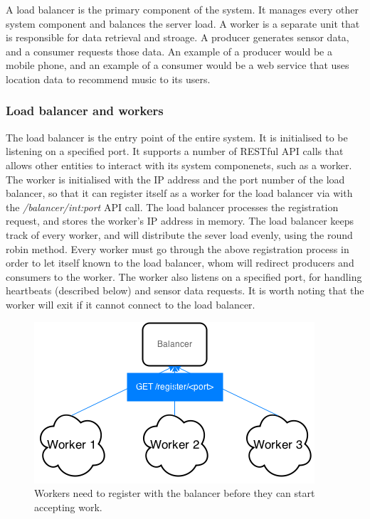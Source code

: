 \documentclass{sigchi}
\begin{document}
A load balancer is the primary component of the system. It manages every other system component and balances the server load. A worker is a separate unit that is responsible for data retrieval and stroage. A producer generates sensor data, and a consumer requests those data. An example of a producer would be a mobile phone, and an example of a consumer would be a web service that uses location data to recommend music to its users.

\subsubsection{Load balancer and workers}

The load balancer is the entry point of the entire system. It is initialised to be listening on a specified port. It supports a number of RESTful API calls that allows other entities to interact with its system componenets, such as a worker. The worker is initialised with the IP address and the port number of the load balancer, so that it can register itself as a worker for the load balancer via with the {\it /balancer/int:port} API call. The load balancer processes the registration request, and stores the worker's IP address in memory. The load balancer keeps track of every worker, and will distribute the sever load evenly, using the round robin method. Every worker must go through the above registration process in order to let itself known to the load balancer, whom will redirect producers and consumers to the worker. The worker also listens on a specified port, for handling heartbeats (described below) and sensor data requests. It is worth noting that the worker will exit if it cannot connect to the load balancer.

\begin{figure}[!h]
\centering
\includegraphics[width=0.9\columnwidth]{img/workerreg}
\caption{Workers need to register with the balancer before they can start accepting work.}
\label{fig:worker}
\end{figure}
\end{document}
